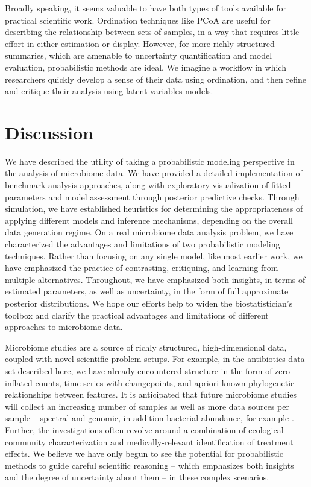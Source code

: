 \documentclass[oupdraft]{bio}
\begin{document}
Broadly speaking, it seems valuable to have both types of tools available for
practical scientific work. Ordination techniques like PCoA are useful for
describing the relationship between sets of samples, in a way that requires
little effort in either estimation or display. However, for more richly
structured summaries, which are amenable to uncertainty quantification and model
evaluation, probabilistic methods are ideal. We imagine a workflow in which
researchers quickly develop a sense of their data using ordination, and then
refine and critique their analysis using latent variables models.

\section{Discussion}

We have described the utility of taking a probabilistic modeling perspective in
the analysis of microbiome data. We have provided a detailed implementation of
benchmark analysis approaches, along with exploratory visualization of fitted
parameters and model assessment through posterior predictive checks. Through
simulation, we have established heuristics for determining the appropriateness
of applying different models and inference mechanisms, depending on the overall
data generation regime. On a real microbiome data analysis problem, we have
characterized the advantages and limitations of two probabilistic modeling
techniques. Rather than focusing on any single model, like most earlier work, we
have emphasized the practice of contrasting, critiquing, and learning from
multiple alternatives. Throughout, we have emphasized both insights, in terms of
estimated parameters, as well as uncertainty, in the form of full approximate
posterior distributions. We hope our efforts help to widen the biostatistician's
toolbox and clarify the practical advantages and limitations of different
approaches to microbiome data.

Microbiome studies are a source of richly structured, high-dimensional data,
coupled with novel scientific problem setups. For example, in the antibiotics
data set described here, we have already encountered structure in the form of
zero-inflated counts, time series with changepoints, and apriori known
phylogenetic relationships between features. It is anticipated that future
microbiome studies will collect an increasing number of samples as well as more
data sources per sample -- spectral and genomic, in addition bacterial
abundance, for example \citep{jansson2016multi}. Further, the investigations
often revolve around a combination of ecological community characterization and
medically-relevant identification of treatment effects. We believe we have only
begun to see the potential for probabilistic methods to guide careful scientific
reasoning -- which emphasizes both insights and the degree of uncertainty about
them -- in these complex scenarios.
\end{document}
